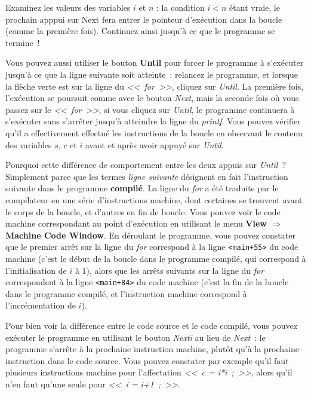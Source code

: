 \documentclass[12pt,a4paper]{article}
\begin{document}
Examinez les valeurs des variables $i$ et
$n$ : la condition $i<n$ étant vraie, le prochain apppui sur Next fera
entrer le pointeur d'exécution dans la boucle (comme la première
fois). Continuez ainsi jusqu'à ce que le programme se termine~!

Vous pouvez aussi utiliser le bouton {\bf Until} pour forcer le
programme à s'exécuter jusqu'à ce que la ligne suivante soit
atteinte~: relancez le programme, et lorsque la flèche verte est sur
la ligne du \textit{<<~for~>>}, cliquez sur \textit{Until}. La
première fois, l'exécution se poursuit comme avec le bouton
\textit{Next}, mais la seconde fois où vous passez sur le
\textit{<<~for~>>}, si vous cliquez sur \textit{Until}, le
programme continuera à s'exécuter
sans s'arrêter jusqu'à atteindre la ligne du \emph{printf}. Vous
pouvez vérifier qu'il a effectivement effectué les
instructions de la boucle en observant le contenu des variables $s$,
$c$ et $i$ avant et après avoir appuyé sur \textit{Until}.

Pourquoi cette différence de comportement entre les deux appuis sur
\textit{Until}~? Simplement parce que les termes \textit{ligne
  suivante} désignent en fait l'instruction suivante dans le programme
\textbf{compilé}. La ligne du \textit{for} a été traduite par le
compilateur en  une série d'instructions machine, dont certaines se
trouvent avant le corps de la boucle, et d'autres en fin de
boucle. Vous pouvez voir le code machine correspondant au point
d'exécution en utilisant le menu \textbf{View $\Rightarrow$ Machine Code
  Window}. En déroulant le programme, vous pouvez constater que le
premier arrêt sur la ligne du \textit{for} correspond à la ligne
\verb|<main+55>| du code machine (c'est le début de la boucle dans le
programme compilé, qui correspond à l'initialisation de $i$ à $1$),
alors que les arrêts suivants sur la ligne du
\textit{for} correspondent à la ligne \verb|<main+84>| du code machine
(c'est la fin de la boucle dans le programme compilé, et l'instruction
machine correspond à l'incrémentation de $i$).

Pour bien voir la différence entre le code source et le code compilé,
vous pouvez exécuter le programme en utilisant le bouton
\textit{Nexti} au lieu de \textit{Next}~: le programme s'arrête à la
prochaine instruction machine, plutôt qu'à la prochaine instruction
dans le code source. Vous pouvez constater par exemple qu'il faut
plusieurs instructions machine pour l'affectation \textit{<<~c =
  i*i~;~>>}, alors qu'il n'en faut qu'une seule pour \textit{<<~i =
  i+1~;~>>}. 
\end{document}
